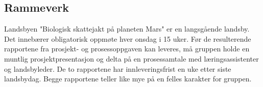 \subsection{Rammeverk}

Landsbyen "Biologisk skattejakt på planeten Mars" er en langsgående landsby.
Det innebærer obligatorisk oppmøte hver onsdag i 15 uker. Før de resulterende rapportene fra prosjekt- og prosessoppgaven kan leveres, må gruppen holde en muntlig prosjektpresentasjon og delta på en prosessamtale med læringsassistenter og landsbyleder.
De to rapportene har innleveringsfrist en uke etter siste landsbydag. Begge rapportene teller like mye på en felles karakter for gruppen.